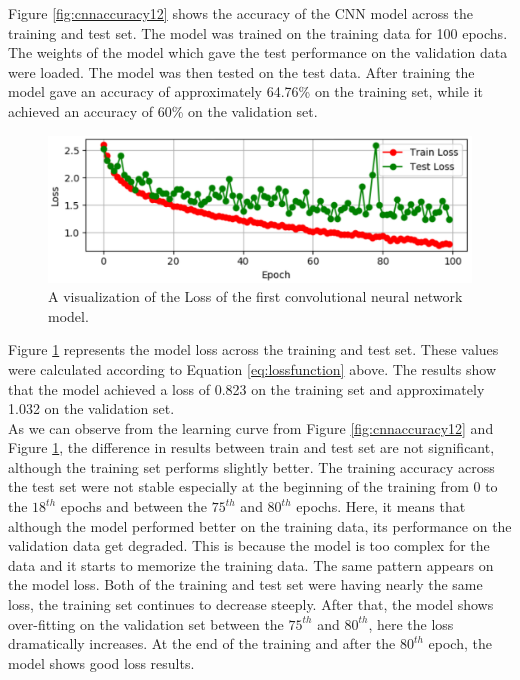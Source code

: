 Figure \ref{fig:cnnaccuracy12} shows the accuracy of the CNN model across the training and test set. The model was trained on the training data for 100 epochs. The weights of the model which gave the test performance on the validation data were loaded. The model was then tested on the test data. After training the model gave an accuracy of approximately 64.76\% on the training set, while it achieved an accuracy of 60\% on the validation set.


\begin{figure}[ht]
\centering
\includegraphics[width=1.0\columnwidth]{Figures/losscnnmodel}
\decoRule
\caption[A visualization of the Loss of the first convolutional neural network model.]{A visualization of the Loss of the first convolutional neural network model.}
\label{fig:cnnaccuracy13}
\end{figure}

Figure \ref{fig:cnnaccuracy13} represents the model loss across the training and test set. These values were calculated according to Equation \ref{eq:lossfunction} above. The results show that the model achieved a loss of 0.823 on the training set and approximately 1.032 on the validation set.\\

As we can observe from the learning curve from Figure \ref{fig:cnnaccuracy12} and Figure \ref{fig:cnnaccuracy13}, the difference in results between train and test set are not significant, although the training set performs slightly better. The training accuracy across the test set were not stable especially at the beginning of the training from 0 to the $18^{th}$ epochs and between the $75^{th}$ and $80^{th}$ epochs. Here, it means that although the model performed better on the training data, its performance on the validation data get degraded. This is because the model is too complex for the data and it starts to memorize the training data. The same pattern appears on the model loss. Both of the training and test set were having nearly the same loss, the training set continues to decrease steeply. After that, the model shows over-fitting on the validation set between the $75^{th}$ and $80^{th}$, here the loss dramatically increases. At the end of the training and after the $80^{th}$ epoch, the model shows good loss results.


